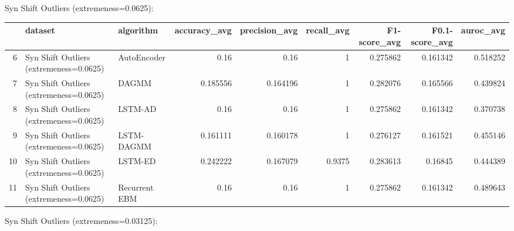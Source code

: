 Syn Shift Outliers (extremeness=0.0625):

\begin{tabular}{rllrrrrrr}
\hline
    & dataset                                 & algorithm     &   accuracy\_avg &   precision\_avg &   recall\_avg &   F1-score\_avg &   F0.1-score\_avg &   auroc\_avg \\
\hline
  6 & Syn Shift Outliers (extremeness=0.0625) & AutoEncoder   &       0.16     &        0.16     &       1      &       0.275862 &         0.161342 &    0.518252 \\
  7 & Syn Shift Outliers (extremeness=0.0625) & DAGMM         &       0.185556 &        0.164196 &       1      &       0.282076 &         0.165566 &    0.439824 \\
  8 & Syn Shift Outliers (extremeness=0.0625) & LSTM-AD       &       0.16     &        0.16     &       1      &       0.275862 &         0.161342 &    0.370738 \\
  9 & Syn Shift Outliers (extremeness=0.0625) & LSTM-DAGMM    &       0.161111 &        0.160178 &       1      &       0.276127 &         0.161521 &    0.455146 \\
 10 & Syn Shift Outliers (extremeness=0.0625) & LSTM-ED       &       0.242222 &        0.167079 &       0.9375 &       0.283613 &         0.16845  &    0.444389 \\
 11 & Syn Shift Outliers (extremeness=0.0625) & Recurrent EBM &       0.16     &        0.16     &       1      &       0.275862 &         0.161342 &    0.489643 \\
\hline
\end{tabular}

Syn Shift Outliers (extremeness=0.03125):

